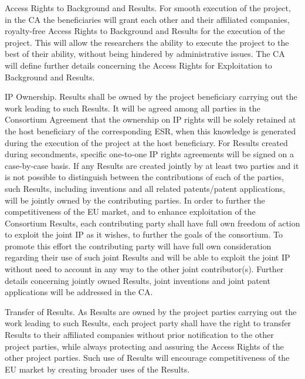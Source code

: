 \noindent \color{blue}Access Rights to Background and Results. \color{black}
For smooth execution of the project, in the CA the beneficiaries will grant each other and their affiliated companies, royalty-free Access Rights to Background and Results for the execution of the project. This will allow the researchers the ability to execute the project to the best of their ability, without being hindered by administrative issues. The CA will define further details concerning the Access Rights for Exploitation to Background and Results.

\noindent \color{blue}IP Ownership. \color{black}
Results shall be owned by the project beneficiary carrying out the work leading to such Results. It will be agreed among all parties in the Consortium Agreement that the ownership on IP rights will be solely retained at the host beneficiary of the corresponding ESR, when this knowledge is generated during the execution of the project at the host beneficiary. For Results created during secondments, specific one-to-one IP rights agreements will be signed on a case-by-case basis.
If any Results are created jointly by at least two parties and it is not possible to distinguish between the contributions of each of the parties, such Results, including inventions and all related patents/patent applications, will be jointly owned by the contributing parties. In order to further the competitiveness of the EU market, and to enhance exploitation of the Consortium Results, each contributing party shall have full own freedom of action to exploit the joint IP as it wishes, to further the goals of the consortium. To promote this effort the contributing party will have full own consideration regarding their use of such joint Results and will be able to exploit the joint IP without need to account in any way to the other joint contributor(s). Further details concerning jointly owned Results, joint inventions and joint patent applications will be addressed in the CA.

\noindent \color{blue}Transfer of Results. \color{black}
As Results are owned by the project parties carrying out the work leading to such Results, each project party shall have the right to transfer Results to their affiliated companies without prior notification to the other project parties, while always protecting and assuring the Access Rights of the other project parties. Such use of Results will encourage competitiveness of the EU market by creating broader uses of the Results.%

